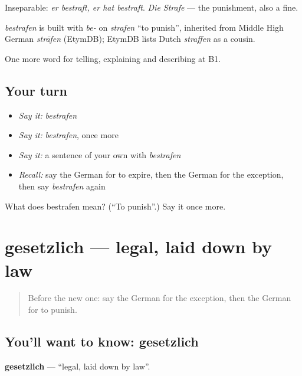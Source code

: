 Inseparable: \emph{er bestraft, er hat bestraft}. \emph{Die Strafe} — the punishment, also a fine.

\begin{cousinweb}
\emph{bestrafen} is built with \emph{be-} on \emph{strafen} \textquotedblleft{}to punish\textquotedblright{}, inherited from Middle High German \emph{strāfen} (EtymDB); EtymDB lists Dutch \emph{straffen} as a cousin.
\end{cousinweb}

\begin{grammarlens}[title={What you've built}]
One more word for telling, explaining and describing at B1.
\end{grammarlens}

\subsection*{Your turn}
\begin{itemize}
\raggedright
  \item \emph{Say it:} \emph{bestrafen}
  \item \emph{Say it:} \emph{bestrafen}, once more
  \item \emph{Say it:} a sentence of your own with \emph{bestrafen}
  \item \emph{Recall:} say the German for to expire, then the German for the exception, then say \emph{bestrafen} again
\end{itemize}

\begin{tcolorbox}[breakable,colback=teal!4,colframe=teal!35!black,title={Before you move on}]
What does bestrafen mean? (\textquotedblleft{}To punish\textquotedblright{}.) Say it once more.
\end{tcolorbox}
\section[gesetzlich]{gesetzlich — legal, laid down by law}

\label{lesson:GE-C385-gesetzlich}



\begin{quote}
Before the new one: say the German for the exception, then the German for to punish.
\end{quote}

\subsection*{You'll want to know: gesetzlich}
\textbf{gesetzlich} — \textquotedblleft{}legal, laid down by law\textquotedblright{}.

